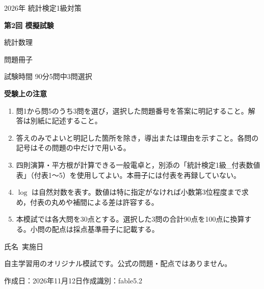 \documentclass[a4paper,11pt]{ltjsarticle}
\begin{document}
\thispagestyle{empty}
\begin{center}
\vspace*{12mm}
{\large 2026年 統計検定1級対策}\par\vspace{8mm}
{\Huge\bfseries 第2回 模擬試験}\par\vspace{7mm}
{\LARGE 統計数理}\par\vspace{6mm}
{\Large 問題冊子}\par\vspace{12mm}
{\large 試験時間 90分\qquad 5問中3問選択}
\end{center}
\vspace{8mm}
\noindent\textbf{受験上の注意}
\begin{enumerate}[label=\arabic*.,leftmargin=2em,itemsep=0.8em]
\item 問1から問5のうち3問を選び，選択した問題番号を答案に明記すること。解答は別紙に記述すること。
\item 答えのみでよいと明記した箇所を除き，導出または理由を示すこと。各問の記号はその問題の中だけで用いる。
\item 四則演算・平方根が計算できる一般電卓と，別添の「統計検定1級\_付表数値表」（付表1〜5）を使用してよい。本冊子には付表を再録していない。
\item $\log$ は自然対数を表す。数値は特に指定がなければ小数第3位程度まで求め，付表の丸めや補間による差は許容する。
\item 本模試では各大問を30点とする。選択した3問の合計90点を100点に換算する。小問の配点は採点基準冊子に記載する。
\end{enumerate}
\vfill
\begin{center}
氏名\ \underline{\hspace{55mm}}\qquad 実施日\ \underline{\hspace{35mm}}\par\vspace{8mm}
\small 自主学習用のオリジナル模試です。公式の問題・配点ではありません。\par
作成日：2026年11月12日\qquad 作成識別：fable5.2
\end{center}
\newpage
\end{document}
